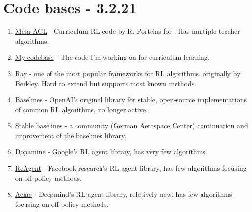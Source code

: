 \documentclass[letterpaper]{article}
\theoremstyle{definition}
\begin{document}
\section{Code bases - 3.2.21} \label{sec:code}

\begin{enumerate}
	
	\item 
	\href{https://github.com/flowersteam/meta-acl}{Meta ACL} - Curriculum RL code by R. Portelas for \cite{Portelas2020a}. Has multiple teacher algorithms.
	
	\item 
	\href{https://github.com/lioritan/phd-work}{My codebase} - The code I'm working on for curriculum learning.
	
	\item 
	\href{https://github.com/ray-project/ray}{Ray} - one of the most popular frameworks for RL algorithms, originally by Berkley. Hard to extend but supports most known methods.
	
	\item \href{https://github.com/openai/baselines}{Baselines} - OpenAI's original library for stable, open-source implementations of common RL algorithms, no longer active.
	
	\item 
	\href{https://github.com/DLR-RM/stable-baselines3}{Stable baselines} - a community (German Aerospace Center) continuation and improvement of the baselines library.
	
	\item 
	\href{https://github.com/google/dopamine}{Dopamine} - Google's RL agent library, has very few algorithms.
	
	\item 
	\href{https://github.com/facebookresearch/ReAgent}{ReAgent} - Facebook research's RL agent library, has few algorithms focusing on off-policy methods.
	
	\item 
	\href{https://github.com/deepmind/acme}{Acme} - Deepmind's RL agent library, relatively new, has few algorithms focusing on off-policy methods. 
	
\end{enumerate}

\end{document}
